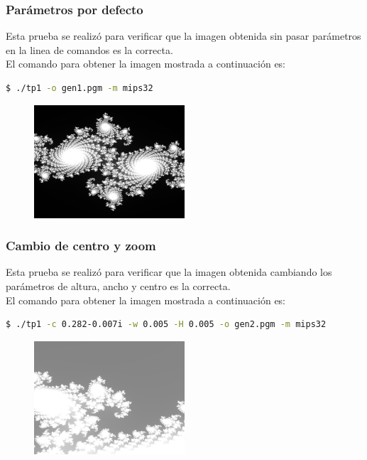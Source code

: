 \documentclass[a4paper,10pt]{article}
\begin{document}
\subsubsection{Parámetros por defecto}
Esta prueba se realizó para verificar que la imagen obtenida sin pasar parámetros en la linea de comandos es la correcta. \\
El comando para obtener la imagen mostrada a continuación es:

\begin{lstlisting}[frame = single, language = bash, numbers=none]
$ ./tp1 -o gen1.pgm -m mips32
\end{lstlisting}

\begin{figure}[H]
 \centering
    \includegraphics[width=0.5\textwidth]{../img_informe/uno.png}
\end{figure}

\subsubsection{Cambio de centro y zoom}
Esta prueba se realizó para verificar que la imagen obtenida cambiando los parámetros de altura, ancho y centro es la correcta. \\
El comando para obtener la imagen mostrada a continuación es:

\begin{lstlisting}[frame = single, language = bash, numbers=none]
$ ./tp1 -c 0.282-0.007i -w 0.005 -H 0.005 -o gen2.pgm -m mips32
\end{lstlisting}

\begin{figure}[H]
 \centering
    \includegraphics[width=0.5\textwidth]{../img_informe/dos.png}
\end{figure}
\end{document}
